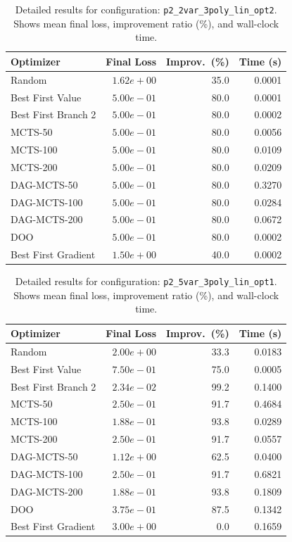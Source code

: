 \begin{table}[H]
\centering
\caption{Detailed results for configuration: \texttt{p2\_2var\_3poly\_lin\_opt2}. Shows mean final loss, improvement ratio (\%), and wall-clock time.}
\label{tab:abssum-detail-8}
\begin{tabular}{lrrr}
\toprule
Optimizer & Final Loss & Improv.~(\%) & Time (s) \\
\midrule
Random & $1.62e+00$ & 35.0 & 0.0001 \\
\hline
Best First Value & \textbf{$5.00e-01$} & 80.0 & 0.0001 \\
\hline
Best First Branch 2 & \textbf{$5.00e-01$} & 80.0 & 0.0002 \\
\hline
MCTS-50 & \textbf{$5.00e-01$} & 80.0 & 0.0056 \\
\hline
MCTS-100 & \textbf{$5.00e-01$} & 80.0 & 0.0109 \\
\hline
MCTS-200 & \textbf{$5.00e-01$} & 80.0 & 0.0209 \\
\hline
DAG-MCTS-50 & \textbf{$5.00e-01$} & 80.0 & 0.3270 \\
\hline
DAG-MCTS-100 & \textbf{$5.00e-01$} & 80.0 & 0.0284 \\
\hline
DAG-MCTS-200 & \textbf{$5.00e-01$} & 80.0 & 0.0672 \\
\hline
DOO & $5.00e-01$ & 80.0 & 0.0002 \\
\hline
Best First Gradient & $1.50e+00$ & 40.0 & 0.0002 \\
\bottomrule
\end{tabular}
\end{table}

\begin{table}[H]
\centering
\caption{Detailed results for configuration: \texttt{p2\_5var\_3poly\_lin\_opt1}. Shows mean final loss, improvement ratio (\%), and wall-clock time.}
\label{tab:abssum-detail-9}
\begin{tabular}{lrrr}
\toprule
Optimizer & Final Loss & Improv.~(\%) & Time (s) \\
\midrule
Random & $2.00e+00$ & 33.3 & 0.0183 \\
\hline
Best First Value & $7.50e-01$ & 75.0 & 0.0005 \\
\hline
Best First Branch 2 & \textbf{$2.34e-02$} & 99.2 & 0.1400 \\
\hline
MCTS-50 & $2.50e-01$ & 91.7 & 0.4684 \\
\hline
MCTS-100 & $1.88e-01$ & 93.8 & 0.0289 \\
\hline
MCTS-200 & $2.50e-01$ & 91.7 & 0.0557 \\
\hline
DAG-MCTS-50 & $1.12e+00$ & 62.5 & 0.0400 \\
\hline
DAG-MCTS-100 & $2.50e-01$ & 91.7 & 0.6821 \\
\hline
DAG-MCTS-200 & $1.88e-01$ & 93.8 & 0.1809 \\
\hline
DOO & $3.75e-01$ & 87.5 & 0.1342 \\
\hline
Best First Gradient & $3.00e+00$ & 0.0 & 0.1659 \\
\bottomrule
\end{tabular}
\end{table}

